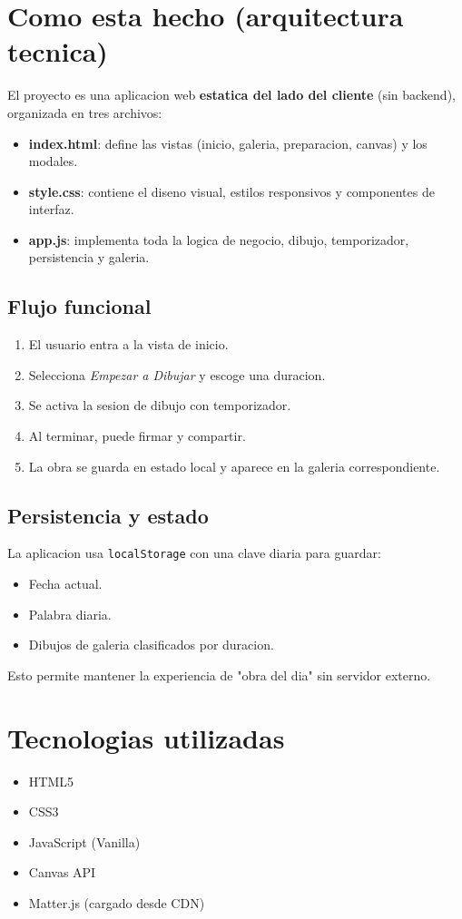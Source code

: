 \documentclass[12pt,a4paper]{article}
\begin{document}
\section{Como esta hecho (arquitectura tecnica)}
El proyecto es una aplicacion web \textbf{estatica del lado del cliente} (sin backend), organizada en tres archivos:

\begin{itemize}[leftmargin=*]
  \item \textbf{index.html}: define las vistas (inicio, galeria, preparacion, canvas) y los modales.
  \item \textbf{style.css}: contiene el diseno visual, estilos responsivos y componentes de interfaz.
  \item \textbf{app.js}: implementa toda la logica de negocio, dibujo, temporizador, persistencia y galeria.
\end{itemize}

\subsection{Flujo funcional}
\begin{enumerate}[leftmargin=*]
  \item El usuario entra a la vista de inicio.
  \item Selecciona \textit{Empezar a Dibujar} y escoge una duracion.
  \item Se activa la sesion de dibujo con temporizador.
  \item Al terminar, puede firmar y compartir.
  \item La obra se guarda en estado local y aparece en la galeria correspondiente.
\end{enumerate}

\subsection{Persistencia y estado}
La aplicacion usa \texttt{localStorage} con una clave diaria para guardar:
\begin{itemize}[leftmargin=*]
  \item Fecha actual.
  \item Palabra diaria.
  \item Dibujos de galeria clasificados por duracion.
\end{itemize}
Esto permite mantener la experiencia de "obra del dia" sin servidor externo.

\section{Tecnologias utilizadas}
\begin{itemize}[leftmargin=*]
  \item HTML5
  \item CSS3
  \item JavaScript (Vanilla)
  \item Canvas API
  \item Matter.js (cargado desde CDN)
\end{itemize}
\end{document}
